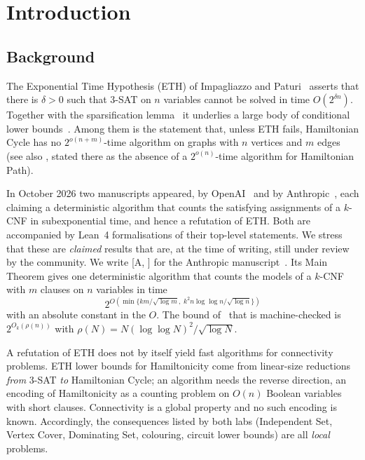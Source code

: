 \documentclass[11pt]{amsart}
\theoremstyle{plain}
\theoremstyle{definition}
\theoremstyle{remark}
\numberwithin{equation}{section}
\newcommand{\A}[1][]{\textup{[A\if\relax\detokenize{#1}\relax\else, #1\fi]}}
\begin{document}
\maketitle

\setcounter{tocdepth}{1}
{\small\tableofcontents}

\section{Introduction}\label{sec:intro}

\subsection{Background}
The Exponential Time Hypothesis (ETH) of Impagliazzo and Paturi~\cite{ImpagliazzoPaturi01}
asserts that there is $\delta>0$ such that $3$-SAT on $n$ variables cannot be solved in time
$O(2^{\delta n})$. Together with the sparsification lemma~\cite{IPZ01} it underlies a large body
of conditional lower bounds~\cite{LMS11,CyganEtAl15}. Among them is the statement that, unless ETH
fails, Hamiltonian Cycle has no $2^{o(n+m)}$-time algorithm on graphs with $n$ vertices and $m$
edges~\cite[Ch.~14]{CyganEtAl15} (see also \cite[Thm.~3.3]{LMS11}, stated there as the
absence of a $2^{o(n)}$-time algorithm for Hamiltonian Path).

In October 2026 two manuscripts appeared, by OpenAI~\cite{OpenAI26} and by
Anthropic~\cite{Anthropic26}, each claiming a deterministic algorithm that counts the satisfying
assignments of a $k$-CNF in subexponential time, and hence a refutation of ETH. Both are
accompanied by Lean~4 formalisations of their top-level statements. We stress that these are
\emph{claimed} results that are, at the time of writing, still under review by the community.
We write \A{} for the Anthropic manuscript~\cite{Anthropic26}. Its Main Theorem gives one
deterministic algorithm that counts the models of a $k$-CNF with $m$ clauses on $n$ variables in
time
\[
  2^{O(\min\{km/\sqrt{\log m},\;k^2 n\log\log n/\sqrt{\log n}\})}
\]
with an absolute constant in the $O$. The bound of~\cite{OpenAI26} that is machine-checked is
$2^{O_k(\rho(n))}$ with $\rho(N) = N(\log\log N)^2/\sqrt{\log N}$.

A refutation of ETH does not by itself yield fast algorithms for connectivity problems. ETH
lower bounds for Hamiltonicity come from linear-size reductions \emph{from} $3$-SAT \emph{to}
Hamiltonian Cycle; an algorithm needs the reverse direction, an encoding of Hamiltonicity as a
counting problem on $O(n)$ Boolean variables with short clauses. Connectivity is a global
property and no such encoding is known. Accordingly, the consequences listed by both labs
(Independent Set, Vertex Cover, Dominating Set, colouring, circuit lower bounds) are all
\emph{local} problems.
\end{document}
